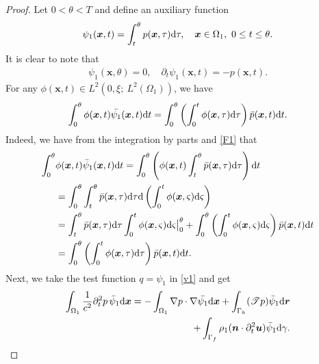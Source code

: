 \documentclass[final,leqno]{siamltex}
\begin{document}
\begin{proof}
 Let $ 0< \theta < T$ and define  an  auxiliary function
 \begin{align*}
  \psi_1 (\boldsymbol x, t) =\int_t^{\theta} p (\boldsymbol x, \tau) {\rm d}
\tau, \quad \boldsymbol x  \in \Omega_1, ~~~ 0 \leq t \leq \theta.
 \end{align*}
It is clear to note that
\begin{align}\label{F1}
\psi_1(\boldsymbol x, \theta)=0, \quad \partial_t\psi_1(\boldsymbol x, t)=-p(\boldsymbol x, t).
\end{align}
For any $\phi (\boldsymbol x, t) \in L^2 \left( 0, \xi;~ L^2 (\Omega_1)
\right)$, we have
\begin{align}\label{F2}
 \int_0^{\theta} \phi (\boldsymbol x, t) \bar {\psi_1} (\boldsymbol x, t) {\rm
d} t= \int_0^{\theta} \left( \int_0^t \phi (\boldsymbol x, \tau) {\rm d} \tau
\right) \bar p (\boldsymbol x, t) {\rm d} t.
\end{align}
Indeed, we have from the integration by parts and \eqref{F1} that
\begin{align*}
 \int_0^{\theta}
 &\phi (\boldsymbol x, t) \bar \psi_1 (\boldsymbol x, t) {\rm d} t
=\int_0^{\theta} \left( \phi (\boldsymbol x, t) \int_t^{\theta} \bar p
(\boldsymbol x, \tau) {\rm d} \tau \right) {\rm d} t\\
 &=\int_0^{\theta}\int_t^{\theta} \bar p (\boldsymbol x, \tau) {\rm d} \tau {\rm
d} \left( \int_0^{t} \phi (\boldsymbol x, \varsigma) {\rm d}\varsigma\right)\\
 &=\int_{t}^{\theta} \bar p (\boldsymbol x, \tau) {\rm d} \tau \int_0^{t} \phi
(\boldsymbol x, \varsigma) {\rm d} \varsigma \big|_0^{\theta}
 +\int_0^{\theta} \left( \int_0^{t} \phi (\boldsymbol x,\varsigma) {\rm d}
\varsigma \right) \bar p (\boldsymbol x, t) {\rm d} t\\
 &=\int_0^{\theta} \left( \int_0^t \phi (\boldsymbol x, \tau) {\rm d} \tau
\right) \bar p (\boldsymbol x, t) {\rm d} t.
\end{align*}
Next, we take the test function $q =\psi_1$ in \eqref{v1} and get
\begin{align}\label{tf}
 \int_{\Omega_1} \frac{1}{c^2} \partial_t^2 p\,  \bar \psi_1 {\rm d}
\boldsymbol x= -\int_{\Omega_1} \nabla p \cdot \nabla \bar {\psi_1} {\rm d}
\boldsymbol x +\int_{\Gamma_h} (\mathscr T p)\bar \psi_1 {\rm d} \boldsymbol
r\notag\\
+\int_{\Gamma_f} \rho_1(\boldsymbol n \cdot \partial_t^2 \boldsymbol
u) \bar{\psi}_1{\rm d} \gamma.
\end{align}

\end{proof}
\end{document}
